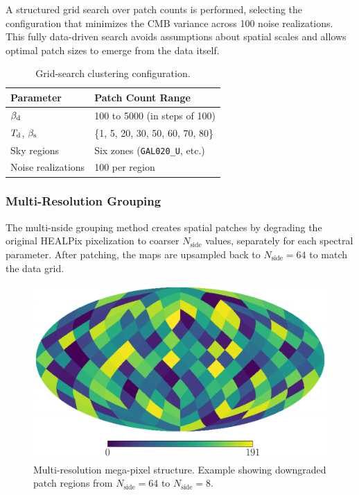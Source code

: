 \documentclass[fleqn,usenatbib]{mnras}
\begin{document}
A structured grid search over patch counts is performed, selecting the configuration that minimizes the CMB variance across 100 noise realizations. This fully data-driven search avoids assumptions about spatial scales and allows optimal patch sizes to emerge from the data itself.

\begin{table}
    \centering
    \small
    \caption{Grid-search clustering configuration.}
    \begin{tabular}{@{}p{3.8cm}|p{4.5cm}@{}}
        \toprule
        \textbf{Parameter} & \textbf{Patch Count Range} \\
        \midrule
        \( \beta_{\rm d} \) & 100 to 5000 (in steps of 100) \\
        \( T_{\rm d} \), \( \beta_{\rm s} \) & \{1, 5, 20, 30, 50, 60, 70, 80\} \\
        Sky regions & Six zones (\texttt{GAL020\_U}, etc.) \\
        Noise realizations & 100 per region \\
        \bottomrule
    \end{tabular}
\end{table}

\subsubsection*{Multi-Resolution Grouping}

The multi-nside grouping method creates spatial patches by degrading the original HEALPix pixelization to coarser \( N_{\text{side}} \) values, separately for each spectral parameter. After patching, the maps are upsampled back to \( N_{\text{side}} = 64 \) to match the data grid.

\begin{figure}
    \centering
    \includegraphics[width=0.9\linewidth]{figures/multi_resolution_pixel_grouping.pdf}
    \caption{Multi-resolution mega-pixel structure. Example showing downgraded patch regions from \( N_{\text{side}} = 64 \) to \( N_{\text{side}} = 8 \).}
    \label{fig:multires_megapixels}
\end{figure}
\end{document}
